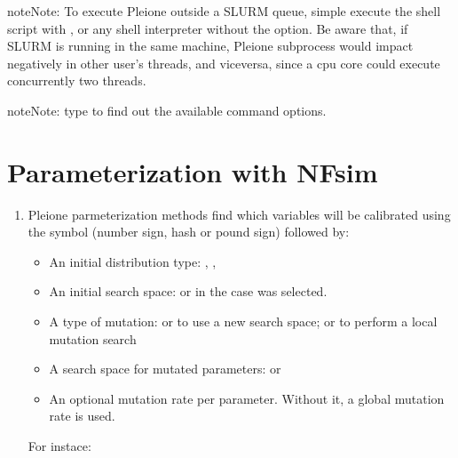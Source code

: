 \documentclass[letterpaper,10pt,english]{sphinxmanual}
\begin{document}
\begin{sphinxadmonition}{note}{Note:}
 To execute Pleione outside a SLURM
queue, simple execute the shell script with ,  or any shell
interpreter without the  option. Be aware that, if SLURM is
running in the same machine, Pleione subprocess would impact negatively in
other user’s threads, and viceversa, since a cpu core could execute
concurrently two threads.
\end{sphinxadmonition}

\begin{sphinxadmonition}{note}{Note:}
 type  to find out the
available command options.
\end{sphinxadmonition}


\section{Parameterization with NFsim}
\label{\detokenize{engines/nfsim:parameterization-with-nfsim}}\label{\detokenize{engines/nfsim::doc}}\begin{enumerate}
\def\theenumi{\arabic{enumi}}
\def\labelenumi{\theenumi .}
\makeatletter\def\p@enumii{\p@enumi \theenumi .}\makeatother
\item {} 

Pleione parmeterization methods find which variables will be calibrated using
the symbol \sphinxcode{\sphinxupquote{\#}} (number sign, hash or pound sign) followed by:
\begin{itemize}
\item {} 
An initial distribution type: , , 

\item {} 
An initial search space:  or 
in the case  was selected.

\item {} 
A type of mutation:  or  to use a new search
space; or  to perform a local mutation search

\item {} 
A search space for mutated parameters:  or

\item {} 
An optional mutation rate per parameter. Without it, a global mutation
rate is used.

\end{itemize}

For instace:

\end{enumerate}
\end{document}
